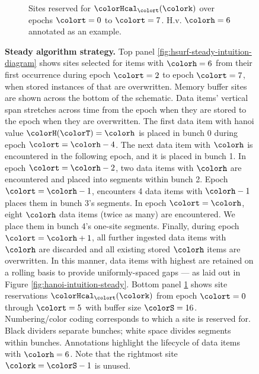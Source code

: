 \begin{figure}[htbp!]
\begin{subfigure}[b]{0.98\linewidth}
\begin{tikzpicture}
    \end{tikzpicture}
    \vspace{-5ex}
    \caption{\footnotesize Sites reserved for \hv{} $\colorHcal_{\colort}(\colork)$ over epochs $\colort=0$ to $\colort=7$. H.v.{} $\colorh=6$ annotated as an example.}
    \label{fig:hsurf-steady-intuition-heatmap}
  \end{subfigure}%
  \vspace{-2ex}
  \caption{
    \textbf{Steady algorithm strategy.}
    \footnotesize
    Top panel \ref{fig:hsurf-steady-intuition-diagram} shows sites selected for items with \hv{} $\colorh=6$ from their first occurrence during epoch $\colort=2$ to epoch $\colort=7$, when stored instances of that \hv{} are overwritten.
    Memory buffer sites are shown across the bottom of the schematic.
    Data items' vertical span stretches across time from the epoch when they are stored to the epoch when they are overwritten.
    The first data item with hanoi value $\colorH(\colorT) = \colorh$ is placed in bunch 0 during epoch $\colort=\colorh-4$.
    The next data item with \hv{} $\colorh$ is encountered in the following epoch, and it is placed in bunch 1.
    In epoch $\colort=\colorh-2$, two data items with \hv{} $\colorh$ are encountered and placed into segments within bunch 2.
    Epoch $\colort=\colorh-1$, encounters 4 data items with \hv{} $\colorh-1$ places them in bunch 3's segments.
    In epoch $\colort=\colorh$, eight \hv{} $\colorh$ data items (twice as many) are encountered.
    We place them in bunch 4's one-site segments.
    Finally, during epoch $\colort=\colorh+1$, all further ingested data items with \hv{} $\colorh$ are discarded and all existing stored \hv{} $\colorh$ items are overwritten.
    In this manner, data items with highest \hv{} are retained on a rolling basis to provide uniformly-spaced gaps --- as laid out in Figure \ref{fig:hanoi-intuition-steady}.
    Bottom panel \ref{fig:hsurf-steady-intuition-heatmap} shows \hv{} site reservations $\colorHcal_{\colort}(\colork)$ from epoch $\colort=0$ through $\colort=5$ with buffer size $\colorS=16$.
    Numbering/color coding corresponds to which \hv{} a site is reserved for.
    Black dividers separate bunches; white space divides segments within bunches.
    Annotations highlight the lifecycle of data items with \hv{} $\colorh=6$.
    Note that the rightmost site $\colork=\colorS-1$ is unused.
  }
  \label{fig:hsurf-steady-intuition}
\end{figure}
